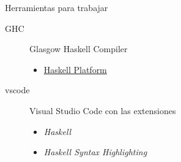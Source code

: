 \begin{frame}{Herramientas para trabajar}
    \begin{description}
        \item[GHC] Glasgow Haskell Compiler
        \begin{itemize}
            \item \href{https://www.haskell.org/downloads/}{Haskell Platform}
        \end{itemize} 
        \item[vscode] Visual Studio Code con las extensiones
        \begin{itemize}
            \item \emph{Haskell}
            \item \emph{Haskell Syntax Highlighting}
        \end{itemize}
    \end{description}
\end{frame}
